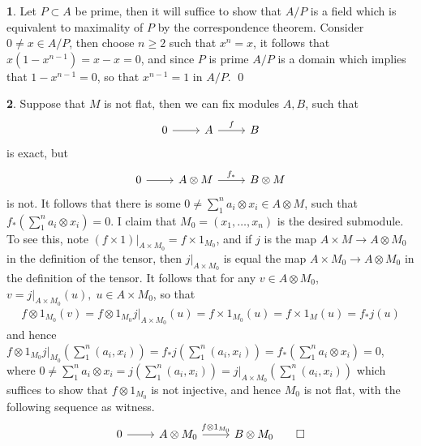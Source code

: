 \documentclass[11pt]{article}
\theoremstyle{definition}
\newtheorem{pb}{}
\begin{document}
    \begin{pb}
        Let \(P \subset A\) be prime, then it will suffice to show that \(A/P\) is a field which is equivalent to maximality of \(P\) by the correspondence theorem. Consider \(0 \neq x \in A/P\), then choose \(n \geq 2\) such that \(x^n = x\), it follows that \(x(1-x^{n-1}) = x-x = 0\), and since \(P\) is prime \(A/P\) is a domain which implies that \(1-x^{n-1} = 0\), so that \(x^{n-1} = 1\) in \(A/P\). \qed
    \end{pb}
    \begin{pb}
        Suppose that \(M\) is not flat, then we can fix modules \(A,B\), such that
        \begin{equation*}
            \begin{tikzcd}
                0 \arrow[r,"{}"] & A \arrow[r,"{f}"] & B
            \end{tikzcd}
        \end{equation*}
        is exact, but
        \begin{equation*}
            \begin{tikzcd}
                0 \arrow[r,"{}"] & A\otimes M \arrow[r,"{f_*}"] & B \otimes M
            \end{tikzcd}
        \end{equation*}
        is not. It follows that there is some \(0 \neq \sum_1^n a_i \otimes x_i \in A \otimes M\), such that \(f_*(\sum_1^n a_i\otimes x_i) = 0\). I claim that \(M_0 = (x_1,\hdots,x_n)\) is the desired submodule. To see this, note \((f \times 1)\vert_{A \times M_0} = f\times 1_{M_0}\), and if \(j\) is the map \(A \times M \to A \otimes M_0\) in the definition of the tensor, then \(j\vert_{A \times M_0}\) is equal the map \(A \times M_0 \to A \otimes M_0\) in the definition of the tensor. It follows that for any \(v \in A \otimes M_0\), \(v = j\vert_{A \times M_0}(u), \; u \in A \times M_0\), so that
        \begin{align*}
            f \otimes 1_{M_0}(v) = f \otimes 1_{M_0}j\vert_{A \times M_0}(u) = f \times 1_{M_0}(u) = f \times 1_M (u) = f_*j(u)
        \end{align*}
        and hence \(f \otimes 1_{M_0}j\vert_{M_0}(\sum_1^n (a_i, x_i)) = f_*j(\sum_1^n (a_i,x_i)) = f_*(\sum_1^n a_i \otimes x_i) = 0\), where \(0 \neq \sum_1^n a_i \otimes x_i =  j(\sum_1^n (a_i,x_i)) = j\vert_{A \times M_0}(\sum_1^n (a_i,x_i))\) which suffices to show that \(f \otimes 1_{M_0}\) is not injective, and hence \(M_0\) is not flat, with the following sequence as witness.
        \begin{equation*}
            \begin{tikzcd}
                0 \arrow[r,"{}"] &A \otimes M_0 \arrow[r,"{f \otimes 1_{M_0}}"] &B \otimes M_0 \qed
            \end{tikzcd}
        \end{equation*}
    \end{pb}
\end{document}
